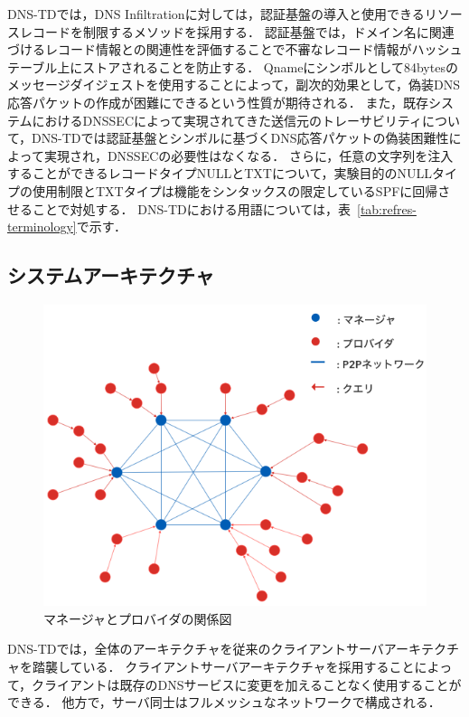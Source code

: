 DNS-TDでは，DNS Infiltrationに対しては，認証基盤の導入と使用できるリソースレコードを制限するメソッドを採用する．
認証基盤では，ドメイン名に関連づけるレコード情報との関連性を評価することで不審なレコード情報がハッシュテーブル上にストアされることを防止する．
Qnameにシンボルとして84bytesのメッセージダイジェストを使用することによって，副次的効果として，偽装DNS応答パケットの作成が困難にできるという性質が期待される．
また，既存システムにおけるDNSSECによって実現されてきた送信元のトレーサビリティについて，DNS-TDでは認証基盤とシンボルに基づくDNS応答パケットの偽装困難性によって実現され，DNSSECの必要性はなくなる．
さらに，任意の文字列を注入することができるレコードタイプNULLとTXTについて，実験目的のNULLタイプの使用制限とTXTタイプは機能をシンタックスの限定しているSPFに回帰させることで対処する．
DNS-TDにおける用語については，表~\ref{tab:refres-terminology}で示す．


\newpage
\subsection{システムアーキテクチャ}
\begin{figure}[htbp]
 \centering
 \includegraphics[scale=0.5]{figure/manager-provider.png}
 \caption{マネージャとプロバイダの関係図}
 \label{fig:manager-provider}
\end{figure}

DNS-TDでは，全体のアーキテクチャを従来のクライアントサーバアーキテクチャを踏襲している．
クライアントサーバアーキテクチャを採用することによって，クライアントは既存のDNSサービスに変更を加えることなく使用することができる．
他方で，サーバ同士はフルメッシュなネットワークで構成される．


